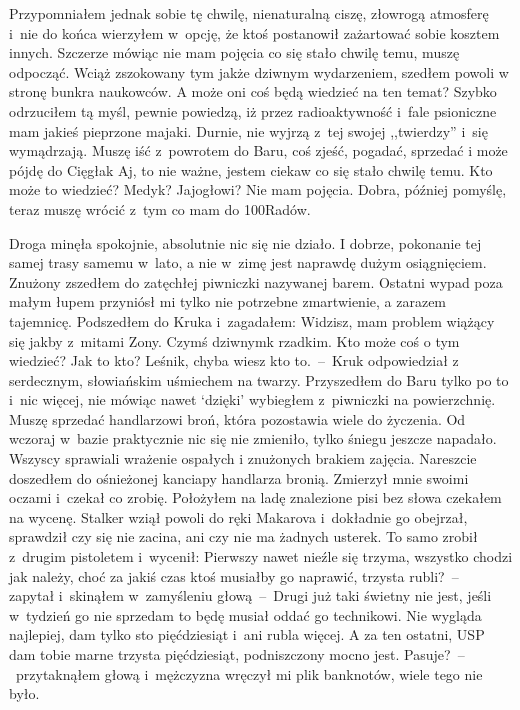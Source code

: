 \documentclass[../MAIN.tex]{subfiles}
\begin{document}
Przypomniałem jednak sobie tę chwilę, nienaturalną ciszę,
złowrogą atmosferę i~nie do końca wierzyłem w~opcję, że ktoś
postanowił zażartować sobie kosztem innych. Szczerze mówiąc nie
mam pojęcia co się stało chwilę temu, muszę odpocząć. Wciąż
zszokowany tym jakże dziwnym wydarzeniem, szedłem powoli w
stronę bunkra naukowców. A może oni coś będą wiedzieć na ten
temat? Szybko odrzuciłem tą myśl, pewnie powiedzą, iż przez
radioaktywność i~fale psioniczne mam jakieś pieprzone majaki.
Durnie, nie wyjrzą z~tej swojej ,,twierdzy'' i~się wymądrzają.
Muszę iść z~powrotem do Baru, coś zjeść, pogadać, sprzedać i
może pójdę do Cięgła\3k Aj, to nie ważne, jestem ciekaw co się
stało chwilę temu. Kto może to wiedzieć? Medyk? Jajogłowi? Nie
mam pojęcia. Dobra, później pomyślę, teraz muszę wrócić z~tym
co mam do 100Radów.

Droga minęła spokojnie, absolutnie nic się nie działo. I
dobrze, pokonanie tej samej trasy samemu w~lato, a nie w~zimę
jest naprawdę dużym osiągnięciem. Znużony zszedłem do zatęchłej
piwniczki nazywanej barem. Ostatni wypad poza małym łupem
przyniósł mi tylko nie potrzebne zmartwienie, a zarazem
tajemnicę. Podszedłem do Kruka i~zagadałem:
\sd
\xx Widzisz, mam problem wiążący się jakby z~mitami Zony. Czymś
dziwnym\3k rzadkim. Kto może coś o tym wiedzieć?
\xx Jak to kto? Leśnik, chyba wiesz kto to.~--~Kruk
odpowiedział z
serdecznym, słowiańskim uśmiechem na twarzy.
\qd
Przyszedłem do Baru tylko po to i~nic więcej, nie mówiąc nawet
‘dzięki’ wybiegłem z~piwniczki na powierzchnię. Muszę sprzedać
handlarzowi broń, która pozostawia wiele do życzenia. Od
wczoraj w~bazie praktycznie nic się nie zmieniło, tylko śniegu
jeszcze napadało. Wszyscy sprawiali wrażenie ospałych i
znużonych brakiem zajęcia. Nareszcie doszedłem do ośnieżonej
kanciapy handlarza bronią. Zmierzył mnie swoimi oczami i~czekał
co zrobię. Położyłem na ladę znalezione pisi bez słowa czekałem
na wycenę. Stalker wziął powoli do ręki Makarova i~dokładnie go
obejrzał, sprawdził czy się nie zacina, ani czy nie ma żadnych
usterek. To samo zrobił z~drugim pistoletem i~wycenił:
\sd
\xx Pierwszy nawet nieźle się trzyma, wszystko chodzi jak
należy,
choć za jakiś czas ktoś musiałby go naprawić, trzysta
rubli?~--~
zapytał i~skinąłem w~zamyśleniu głową~--~Drugi już taki świetny
nie jest, jeśli w~tydzień go nie sprzedam to będę musiał oddać
go technikowi. Nie wygląda najlepiej, dam tylko sto
pięćdziesiąt i~ani rubla więcej. A za ten ostatni, USP dam
tobie marne trzysta pięćdziesiąt, podniszczony mocno jest.
Pasuje?~--~przytaknąłem głową i~mężczyzna wręczył mi plik
banknotów, wiele tego nie było.
\end{document}
